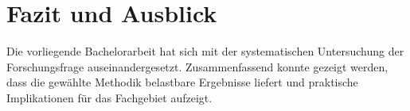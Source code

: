 
\section{Fazit und Ausblick}
\label{sec:fazit}


Die vorliegende Bachelorarbeit hat sich mit der systematischen Untersuchung der Forschungsfrage auseinandergesetzt. Zusammenfassend konnte gezeigt werden, dass die gewählte Methodik belastbare Ergebnisse liefert und praktische Implikationen für das Fachgebiet aufzeigt.

\lipsum[4-5]

